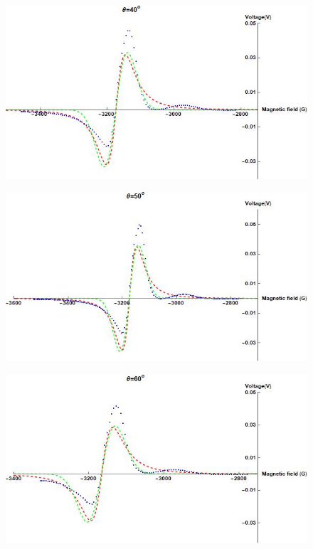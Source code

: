 \documentclass[openany,11pt,a4paper]{report}
\begin{document}
\begin{figure}[H]
\centering
\includegraphics[scale=0.6]{40.jpg}
\end{figure}





\begin{figure}[H]
\centering
\includegraphics[scale=0.6]{50.jpg}
\end{figure}






\begin{figure}[H]
\centering
\includegraphics[scale=0.6]{60.jpg}
\end{figure}
\end{document}
